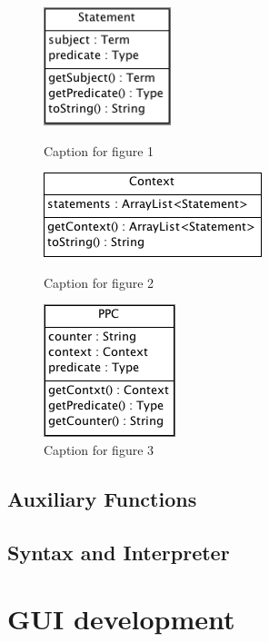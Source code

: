 \documentclass[a4paper,11pt,twoside]{report}
\begin{document}
\begin{figure}
\centering
\begin{minipage}{.3\textwidth}
\centering
\includegraphics[scale=0.8]{Statement}
\caption{Caption for figure 1}
\label{fig:test1}
\end{minipage}\hfill
\begin{minipage}{.3\textwidth}
\centering
\includegraphics[scale=0.65]{Context}
\caption{Caption for figure 2}
\label{fig:test2}
\end{minipage}\hfill
\begin{minipage}{.3\textwidth}
\centering
\includegraphics[scale=0.7]{PPC}
\caption{Caption for figure 3}
\label{fig:test3}
\end{minipage}
\end{figure}


\section{Auxiliary Functions}

\section{Syntax and Interpreter}

\chapter{GUI development}
\end{document}
